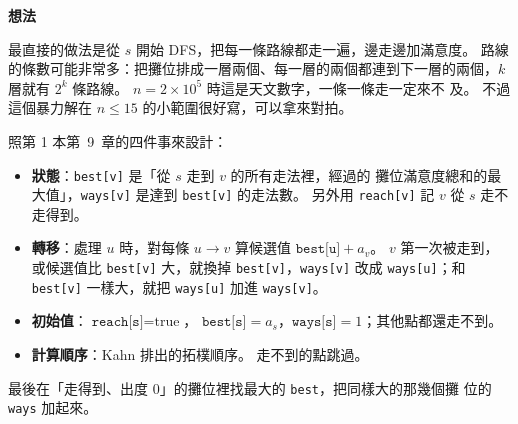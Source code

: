 \begin{center}
\label{fig:nightmarket}
\end{center}

\textbf{想法}

最直接的做法是從 $s$ 開始 DFS，把每一條路線都走一遍，邊走邊加滿意度。 路線
的條數可能非常多：把攤位排成一層兩個、每一層的兩個都連到下一層的兩個，$k$
層就有 $2^k$ 條路線。 $n = 2 \times 10^5$ 時這是天文數字，一條一條走一定來不
及。 不過這個暴力解在 $n \le 15$ 的小範圍很好寫，可以拿來對拍。

照第 1 本第~9~章的四件事來設計：

\begin{itemize}
\item \textbf{狀態}：\texttt{best[v]} 是「從 $s$ 走到 $v$ 的所有走法裡，經過的
攤位滿意度總和的最大值」，\texttt{ways[v]} 是達到 \texttt{best[v]} 的走法數。
另外用 \texttt{reach[v]} 記 $v$ 從 $s$ 走不走得到。
\item \textbf{轉移}：處理 $u$ 時，對每條 $u \to v$ 算候選值
$\texttt{best[u]} + a_v$。 $v$ 第一次被走到，或候選值比 \texttt{best[v]}
大，就換掉 \texttt{best[v]}，\texttt{ways[v]} 改成 \texttt{ways[u]}；和
\texttt{best[v]} 一樣大，就把 \texttt{ways[u]} 加進 \texttt{ways[v]}。
\item \textbf{初始值}：$\texttt{reach[s]} = \text{true}$，
$\texttt{best[s]} = a_s$，$\texttt{ways[s]} = 1$；其他點都還走不到。
\item \textbf{計算順序}：Kahn 排出的拓樸順序。 走不到的點跳過。
\end{itemize}

最後在「走得到、出度 $0$」的攤位裡找最大的 \texttt{best}，把同樣大的那幾個攤
位的 \texttt{ways} 加起來。

